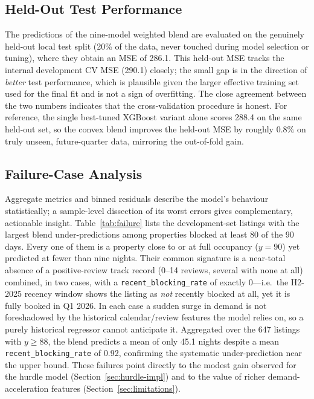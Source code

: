 \documentclass[journal]{IEEEtran}
\begin{document}
\subsection{Held-Out Test Performance}
\label{sec:heldout}
The predictions of the nine-model weighted blend are evaluated on the
genuinely held-out local test split (20\% of the data, never touched during
model selection or tuning), where they obtain an MSE of 286.1. This held-out
MSE tracks the internal development CV MSE (290.1) closely; the small gap is
in the direction of \emph{better} test performance, which is plausible given
the larger effective training set used for the final fit and is not a sign of
overfitting. The close agreement between the two numbers indicates that the
cross-validation procedure is honest. For reference, the single best-tuned
XGBoost variant alone scores 288.4 on the same held-out set, so the convex
blend improves the held-out MSE by roughly $0.8\%$ on truly unseen,
future-quarter data, mirroring the out-of-fold gain.

\subsection{Failure-Case Analysis}
\label{sec:failure}
Aggregate metrics and binned residuals describe the model's behaviour
statistically; a sample-level dissection of its worst errors gives
complementary, actionable insight. Table~\ref{tab:failure} lists the
development-set listings with the largest blend under-predictions among
properties blocked at least 80 of the 90 days. Every one of them is a property
close to or at full occupancy ($y=90$) yet predicted at fewer than nine
nights. Their common signature is a near-total absence of a positive-review
track record (0--14 reviews, several with none at all) combined, in two cases,
with a \texttt{recent\_blocking\_rate} of exactly $0$---i.e.\ the H2-2025
recency window shows the listing as \emph{not} recently blocked at all, yet it
is fully booked in Q1 2026. In each case a sudden surge in demand is not
foreshadowed by the historical calendar/review features the model relies on,
so a purely historical regressor cannot anticipate it. Aggregated over the 647
listings with $y\ge88$, the blend predicts a mean of only 45.1 nights despite
a mean \texttt{recent\_blocking\_rate} of 0.92, confirming the systematic
under-prediction near the upper bound. These failures point directly to the
modest gain observed for the hurdle model (Section~\ref{sec:hurdle-impl}) and
to the value of richer demand-acceleration features
(Section~\ref{sec:limitations}).
\end{document}
